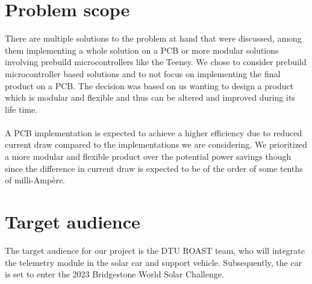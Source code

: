 \documentclass[]{article}
\begin{document}
\section{Problem scope}

There are multiple solutions to the problem at hand that were discussed, among them implementing a whole solution on a PCB or more modular solutions involving prebuild microcontrollers like the Teensy\cite{teensy}. We chose to consider prebuild microcontroller based solutions and to not focus on implementing the final product on a PCB. The decision was based on us wanting to design a product which is modular and flexible and thus can be altered and improved during its life time.\\
\\
A PCB implementation is expected to achieve a higher efficiency due to reduced current draw compared to the implementations we are considering. We prioritized a more modular and flexible product over the potential power savings though since the difference in current draw is expected to be of the order of some tenths of milli-Ampère.

\section{Target audience}
The target audience for our project is the DTU ROAST team, who will integrate the telemetry module in the solar car and support vehicle. Subsequently, the car is set to enter the 2023 Bridgestone World Solar Challenge.
\end{document}
